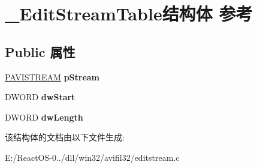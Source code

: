 \hypertarget{struct___edit_stream_table}{}\section{\+\_\+\+Edit\+Stream\+Table结构体 参考}
\label{struct___edit_stream_table}
\subsection*{Public 属性}
\begin{DoxyCompactItemize}
\item 
\mbox{\label{struct___edit_stream_table_aad92eb9e2a48a9b300f274dc91fd4b45}} 
\hyperlink{interface_i_a_v_i_stream}{P\+A\+V\+I\+S\+T\+R\+E\+AM} {\bfseries p\+Stream}
\item 
\mbox{\label{struct___edit_stream_table_aaf1c01bfde1bd2ed8248a6721690fccb}} 
D\+W\+O\+RD {\bfseries dw\+Start}
\item 
\mbox{\label{struct___edit_stream_table_a24c766dd516371583445fe782340f532}} 
D\+W\+O\+RD {\bfseries dw\+Length}
\end{DoxyCompactItemize}


该结构体的文档由以下文件生成\+:\begin{DoxyCompactItemize}
\item 
E\+:/\+React\+O\+S-\/0../dll/win32/avifil32/editstream.\+c\end{DoxyCompactItemize}
